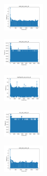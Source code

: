 \begin{figure}[H]
\begin{subfigure}
    \end{subfigure}
    \hfill
    \begin{subfigure}
        \centering
        \includegraphics[width=0.234\textwidth]{img/am01mej/ecoli_set_const_10_589741062_time.png}
    \end{subfigure}
    \hfill
    \begin{subfigure}
        \centering
        \includegraphics[width=0.234\textwidth]{img/am01mej/rand_set_const_10_589741062_time.png}
    \end{subfigure}
    \hfill
    \begin{subfigure}
        \centering
        \includegraphics[width=0.234\textwidth]{img/am01mej/newthyroid_set_const_10_589741062_time.png}
    \end{subfigure}
    \hfill
    \begin{subfigure}
        \centering
        \includegraphics[width=0.234\textwidth]{img/am01mej/iris_set_const_10_277451237_time.png}
    \end{subfigure}
    \hfill
    \begin{subfigure}
        \centering
        \includegraphics[width=0.234\textwidth]{img/am01mej/ecoli_set_const_10_277451237_time.png}
    \end{subfigure}

\end{figure}
